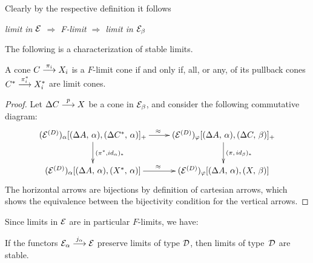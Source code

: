 Clearly by the respective definition it follows
\begin{observation}  
\emph 
   {
    limit in  $\mathcal{E}$ \; $\Rightarrow$ \;
    F-limit \; $\Rightarrow$ \;
    limit in  $\mathcal{E}_\beta$ 
   }
\end{observation} 
%
The following is a characterization of stable limits.
\begin{proposition} \label{preGray4.1}
A cone $C \overset {\pi_i} {\longrightarrow} X_i$ is a $F$-limit cone if and only if, all, or any, of its pullback cones $C^* \overset {\pi^*_i} {\longrightarrow} X^*_i$ are limit cones.
\end{proposition}
\begin{proof}
Let $\Delta C \overset {p} {\longrightarrow} X$ be a cone in $\mathcal{E}_\beta$, and consider the following commutative diagram:
$$
\xymatrix
    {
     (\cc{E}^{(D)})_\alpha[(\Delta A,\,\alpha), (\Delta C^*,\,\alpha)]_{+}  
                  \ar[r]^\approx
                  \ar[d]^{(\pi^*, id_\alpha)_*} 
   & (\cc{E}^{(D)})_\varphi[(\Delta A,\,\alpha), (\Delta C,\,\beta)]_{+} 
                  \ar[d]^{(\pi,\, id_\beta)_*}
  \\
     (\cc{E}^{(D)})_\alpha[(\Delta A,\,\alpha), (X^*,\,\alpha)]
                 \ar[r]^\approx
   & (\cc{E}^{(D)})_\varphi[(\Delta A,\,\alpha), (X,\,\beta)]
    }	  
$$
The horizontal arrows are bijections by definition of cartesian arrows, which shows the equivalence between the bijectivity condition for the vertical arrows.   
\end{proof}
Since limits in $\mathcal{E}$ are in particular $F$-limits, we have:
\begin{corollary}
If the functors $\mathcal{E}_\alpha \overset {j_\alpha} {\longrightarrow} \mathcal{E}$ preserve limits of type 
$\mathcal{D}$, then limits of \mbox{type $\mathcal{D}$} are stable. \cqd
\end{corollary}

